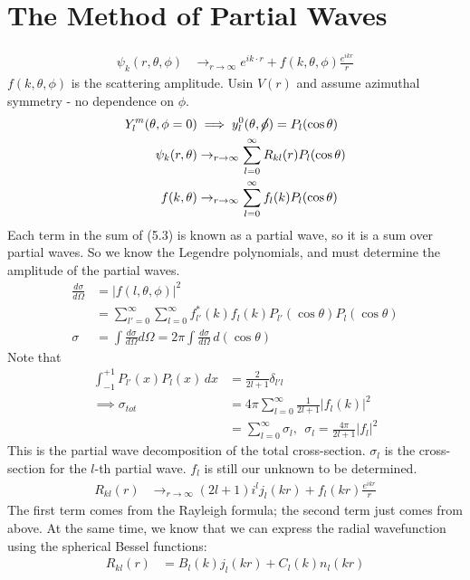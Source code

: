 \documentclass[a4paper, 11pt, normalem]{report}
\begin{document}
\chapter{The Method of Partial Waves}
\begin{align}
    \psi_k(r,\theta,\phi) &\to_{r\to\infty} e^{ik\cdot r} + f(k,\theta, \phi)\frac{e^{ikr}}{r}
\end{align}
$f(k,\theta,\phi)$ is the scattering amplitude. 
Usin $V(r)$ and assume azimuthal symmetry - no dependence on $\phi$.
\begin{align}
    Y_l^m(\theta,\phi=0) &\implies y_l^0(\theta,\cancel{\phi}) = P_l(\cos\theta) \\
    \psi_k(r,\theta) &\to_{r\to\infty} \sum_{l=0}^\infty R_{kl}(r)P_l(\cos\theta) \\
    f(k,\theta) &\to_{r\to\infty} \sum_{l=0}^\infty f_l(k)P_l(\cos\theta)
\end{align}
Each term in the sum of (5.3) is known as a partial wave, so it is a sum over partial waves.
So we know the Legendre polynomials, and must determine the amplitude of the partial waves.
\begin{align}
    \frac{d\sigma}{d\Omega} &= |f(l,\theta,\phi)|^2 \\
                            &= \sum_{l'=0}^\infty\sum_{l=0}^\infty f_{l'}^*(k)f_l(k) P_{l'}(\cos\theta)P_l(\cos\theta) \\
    \sigma &= \int \frac{d\sigma}{d\Omega}d\Omega = 2\pi \int \frac{d\sigma}{d\Omega}\,d(\cos\theta)
\end{align}
Note that
\begin{align}
    \int_{-1}^{+1} P_{l'}(x)P_l(x) \,dx &= \frac{2}{2l+1}\delta_{l'l} \\
    \implies \sigma_{tot} &= 4\pi \sum_{l=0}^\infty \frac{1}{2l+1}|f_l(k)|^2 \\
                          &= \sum_{l=0}^\infty \sigma_l,~~ \sigma_l = \frac{4\pi}{2l+1}|f_l|^2
\end{align}
This is the partial wave decomposition of the total cross-section. 
$\sigma_l$ is the cross-section for the $l$-th partial wave.
$f_l$ is still our unknown to be determined.
\begin{align}
    R_{kl}(r) &\to_{r\to\infty} (2l+1) i^l j_l(kr) + f_l(kr)\frac{e^{ikr}}{r}
\end{align}
The first term comes from the Rayleigh formula; the second term just comes from above.
At the same time, we know that we can express the radial wavefunction using the spherical Bessel functions:
\begin{align}
    R_{kl}(r) &= B_l(k)j_l(kr) + C_l(k)n_l(kr)
\end{align}
\end{document}
